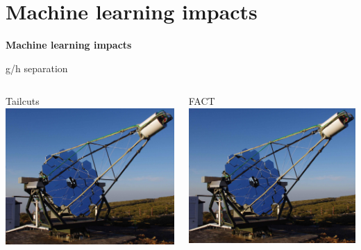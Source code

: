 
\section{Machine learning impacts}

\begin{frame}
    \centering
    {\Huge \textbf{Machine learning impacts}}
\end{frame}


\begin{frame}{g/h separation}
    \begin{columns}[T] %
        \begin{column}{.48\textwidth}
            Tailcuts
            \includegraphics[width=\linewidth]{images/fact_telescope.jpg}
        \end{column}
        \begin{column}{.48\textwidth}
            FACT
            \includegraphics[width=\linewidth]{images/fact_telescope.jpg}
        \end{column}
    \end{columns}
\end{frame}

